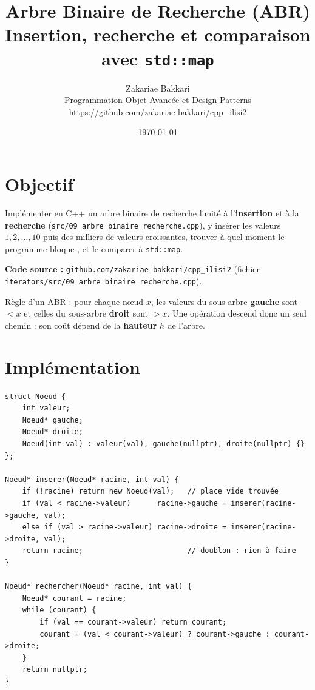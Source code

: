 \documentclass[11pt,a4paper]{article}
\title{\textbf{Arbre Binaire de Recherche (ABR)}\\[4pt]
       \large Insertion, recherche et comparaison avec \texttt{std::map}}
\author{Zakariae Bakkari\\
        \small Programmation Objet Avancée et Design Patterns\\
        \small\url{https://github.com/zakariae-bakkari/cpp_ilisi2}}
\date{\today}
\begin{document}
\maketitle

\section{Objectif}

Implémenter en C++ un arbre binaire de recherche limité à l'\textbf{insertion} et à la
\textbf{recherche} (\texttt{src/09\_arbre\_binaire\_recherche.cpp}), y insérer les valeurs
$1, 2, \dots, 10$ puis des milliers de valeurs croissantes, trouver à quel moment le
programme \og bloque \fg{}, et le comparer à \texttt{std::map}.

\textbf{Code source :}
\href{https://github.com/zakariae-bakkari/cpp_ilisi2/blob/main/iterators/src/09_arbre_binaire_recherche.cpp}{\texttt{github.com/zakariae-bakkari/cpp\_ilisi2}}
(fichier \texttt{iterators/src/09\_arbre\_binaire\_recherche.cpp}).

Règle d'un ABR : pour chaque nœud $x$, les valeurs du sous-arbre \textbf{gauche} sont
$< x$ et celles du sous-arbre \textbf{droit} sont $> x$. Une opération descend donc un seul
chemin : son coût dépend de la \textbf{hauteur} $h$ de l'arbre.

\section{Implémentation}

\begin{lstlisting}[caption={Nœud, insertion (récursive) et recherche (itérative).}]
struct Noeud {
    int valeur;
    Noeud* gauche;
    Noeud* droite;
    Noeud(int val) : valeur(val), gauche(nullptr), droite(nullptr) {}
};

Noeud* inserer(Noeud* racine, int val) {
    if (!racine) return new Noeud(val);   // place vide trouvée
    if (val < racine->valeur)      racine->gauche = inserer(racine->gauche, val);
    else if (val > racine->valeur) racine->droite = inserer(racine->droite, val);
    return racine;                        // doublon : rien à faire
}

Noeud* rechercher(Noeud* racine, int val) {
    Noeud* courant = racine;
    while (courant) {
        if (val == courant->valeur) return courant;
        courant = (val < courant->valeur) ? courant->gauche : courant->droite;
    }
    return nullptr;
}
\end{lstlisting}
\end{document}
